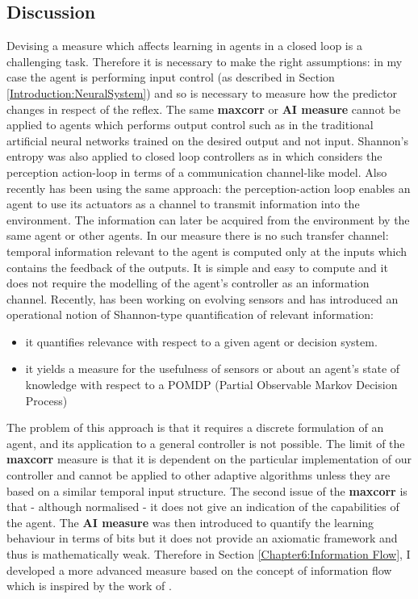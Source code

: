 \subsection{Discussion}
Devising a measure which affects learning in agents in a closed loop is a challenging task.
Therefore it is necessary to make the right assumptions: in my case the agent
is performing input control (as described in Section \ref{Introduction:NeuralSystem})
and so is necessary to measure how the predictor changes in respect of the reflex.
The same \textbf{maxcorr} or \textbf{AI measure} cannot be applied to agents
which performs output control such as in the traditional artificial neural networks
trained on the desired output and not input.
Shannon's entropy was also applied to closed loop controllers as in
\citet{PhysRevLett.84.1156} which considers the perception action-loop
in terms of a communication channel-like model.
Also \citet{organizationInfo} recently has been using the
same approach: the perception-action loop enables an agent to use its actuators
as a channel to transmit information into the environment.
The information can later be acquired from the environment by the same agent or other agents.
In our measure there is no such transfer channel: temporal information
relevant to the agent is computed only at the inputs which contains the feedback
of the outputs. It is simple and easy to compute and it does not require the modelling of the agent's
controller as an information channel.
Recently, \citet{Polani2001} has been working on evolving sensors and has
 introduced an operational notion of Shannon-type quantification of relevant information:
\begin{itemize}
 \item it quantifies relevance with respect to a given agent or decision system.
 \item it yields a measure for the usefulness of sensors or about an agent's state
of knowledge with respect to a POMDP (Partial Observable Markov Decision Process)
\end{itemize}
The problem of this approach is that it requires a discrete formulation of
an agent, and its application to a general controller is not possible.
The limit of the \textbf{maxcorr} measure is that it is dependent on the particular implementation
of our controller and cannot be applied to other adaptive algorithms unless
they are based on a similar temporal input structure.
The second issue of the \textbf{maxcorr} is that - although normalised - it does not
give an indication of the capabilities of the agent.
The \textbf{AI measure} was then introduced to quantify the learning
behaviour in terms of bits but it does not provide an axiomatic framework and
thus is mathematically weak.
Therefore in Section \ref{Chapter6:Information Flow}, I developed a more
advanced measure based on the concept of information flow which is inspired by the
work of \citet{LungarellaInformation}.



